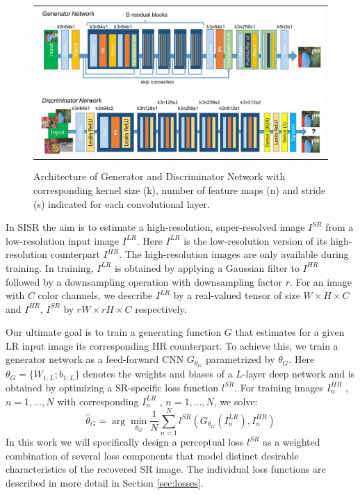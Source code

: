 \documentclass[10pt,twocolumn,letterpaper]{article}
\begin{document}
\begin{figure}[ht!]
\begin{center}
\begin{tabular}{c}
\includegraphics[width=6.5in]{images/used/jpg/generator}\\
\includegraphics[width=6.5in]{images/used/jpg/discriminator}
\end{tabular}
\end{center}
\caption{Architecture of Generator and Discriminator Network with corresponding kernel size (k), number of feature maps (n) and stride (s) indicated for each convolutional layer.}
\label{fig:generator}
\end{figure}
%
In \ac{SISR} the aim is to estimate a high-resolution, super-resolved image $I^{SR}$ from a low-resolution input image $I^{LR}$. Here $I^{LR}$ is the low-resolution version of its high-resolution counterpart $I^{HR}$. The high-resolution images are only available during training. In training, $I^{LR}$ is obtained by applying a Gaussian filter to $I^{HR}$ followed by a downsampling operation with downsampling factor $r$. For an image with $C$ color channels, we describe $I^{LR}$ by a real-valued tensor of size $W \times H \times C$ and $I^{HR}$, $I^{SR}$ by $rW \times rH \times C$ respectively.

Our ultimate goal is to train a generating function $G$ that estimates for a given \ac{LR} input image its corresponding \ac{HR} counterpart. To achieve this, we train a generator network as a feed-forward \ac{CNN} $G_{\theta_G}$ parametrized by ${\theta_G}$. Here ${\theta_G}=\{W_{1:L}; b_{1:L}\}$ denotes the weights and biases of a $L$-layer deep network and is obtained by optimizing a SR-specific loss function $l^{SR}$. For training images $I^{HR}_n$ , $n = 1,\dots,N$ with corresponding $I^{LR}_n$ , $n = 1,\dots,N$, we solve:
\begin{equation}
\hat{{\theta}}_G = \arg\min_{\theta_G} \frac{1}{N} \sum_{n=1}^{N}{l^{SR}(G_{\theta_G}(I^{LR}_n),I^{HR}_n)}
\end{equation}
In this work we will specifically design a perceptual loss $l^{SR}$ as a weighted combination of several loss components that model distinct desirable characteristics of the recovered \ac{SR} image. The individual loss functions are described in more detail in Section \ref{sec:losses}.
\end{document}
